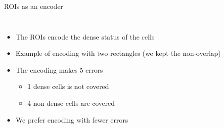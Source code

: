 \documentclass[10pt]{beamer}
\begin{document}
\begin{frame}{ROIs as an encoder}

\begin{columns}[T, onlytextwidth]
    \begin{itemize}
        \item <1->The ROIs encode the dense status of the cells
        \item <1->Example of encoding with two rectangles (we kept the non-overlap)
        \item <2-> The encoding makes 5 errors
        \begin{itemize}
            \item <3->1 dense cells is not covered
            \item <4->4 non-dense cells are covered
        \end{itemize}
        \item <5-> We prefer encoding with fewer errors
    \end{itemize}
    

\end{columns}
\end{frame}
\end{document}
